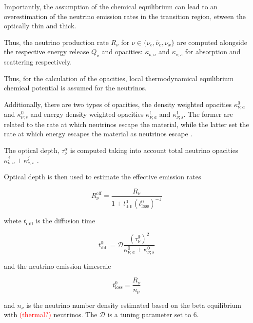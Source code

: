 \documentclass[11pt,a4paper,headinclude=true,DIV=14,BCOR=8mm,chapterprefix,listof=totoc,twoside,openright,abstracton]{scrbook}
\newcommand{\red}[1]{\textcolor{red}{#1}}
\begin{document}
Importantly, the assumption of the chemical equilibrium can lead to an overestimation of the neutrino emission rates in the transition region, etween the optically thin and thick.


Thus, the neutrino production rate $R_{\nu}$ for $\nu\in\{\nu_e,\bar{\nu}_e,\nu_x\}$ are computed alongside the respective energy release $Q_{\nu}$ and opacities: $\kappa_{\nu;a}$ and $\kappa_{\nu;s}$ for absorption and scattering respectively.

Thus, for the calculation of the opacities, local thermodynamical equilibrium chemical potential
is assumed for the neutrinos.

Additionally, there are two types of opacities, the density weighted opacities $\kappa_{\nu;a}^0$ and $\kappa_{\nu;s}^0$ and energy density weighted opacities $\kappa_{\nu;a}^1$ and $\kappa_{\nu;s}^1$. 
The former are related to the rate at which neutrinos escape the material, while the latter set the rate at which energy escapes the material as neutrinos escape \cite{Ruffert:1995fs}.

The optical depth, $\tau_{\nu}^{\alpha}$ is computed taking into account total neutrino opacities $\kappa_{\nu;a}^j + \kappa_{\nu;s}^j$ \cite{Neilsen:2014hha}.

Optical depth is then used to estimate the effective emission rates \cite{Ruffert:1995fs}

\begin{equation}
R_{\nu}^{\text{eff}} = \frac{R_{\nu}}{1 + t_{\text{diff}}^0(t^0_{\text{loss}})^{-1}}
\label{eq:method:whisky:Rnueff}
\end{equation}

whete $t_{\text{diff}}$ is the diffusion time

\begin{equation}
t_{\text{diff}}^{0} = \mathcal{D}\frac{(\tau_{\nu}^0)^2}{\kappa_{\nu;a}^0 + \kappa_{\nu;s}^0}
\end{equation}

and the neutrino emission timescale 

\begin{equation}
t_{\text{loss}}^0 = \frac{R_{\nu}}{n_{\nu}}
\end{equation}

and $n_{\nu}$ is the neutrino number density estimated based on the beta equilibrium with \red{(thermal?)} neutrinos.
The $\mathcal{D}$ is a tuning parameter set to $6$.
\end{document}
